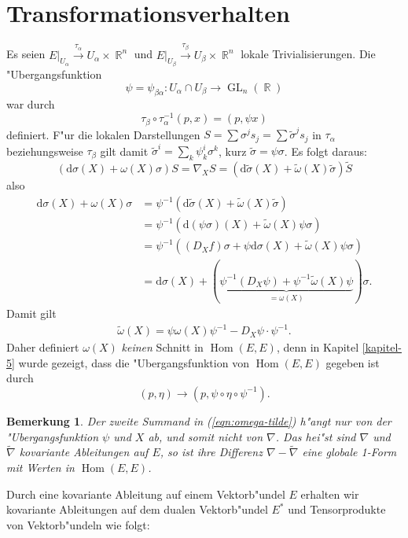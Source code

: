 \documentclass[paper=A4, twoside, chapterprefix=true, bibliography=totoc, headsepline]{scrbook}
\DeclareMathOperator{\R}{\mathbb{R}}
\DeclareMathOperator{\GL}{GL} %
\DeclareMathOperator{\Hom}{Hom} %
\newcommand{\dop}{\mathrm{d}}
\newcommand{\X}{\times}
\theoremstyle{plain}
\theoremstyle{nonumberplain}
\newtheorem{bem}{Bemerkung}
\theoremstyle{empty}
\theoremstyle{break}
\begin{document}
\section{Transformationsverhalten}

Es seien $E|_{U_\alpha} \overset{\tau_\alpha}{\to} U_\alpha \X \R^n$ und $E|_{U_\beta} \overset{\tau_\beta}{\to} U_{\beta} \X \R^n$ lokale Trivialisierungen. Die "Ubergangsfunktion
\[ \psi = \psi_{\beta\alpha}: U_\alpha \cap U_\beta \to \GL_n(\R) \]
war durch
\[ \tau_\beta \circ \tau_\alpha^{-1} (p,x) = (p, \psi x) \]
definiert.
F"ur die lokalen Darstellungen $S = \sum \sigma^j s_j = \sum \tilde\sigma^j s_j$ in $\tau_\alpha$ beziehungsweise $\tau_\beta$ gilt damit $\tilde\sigma^{i} = \sum_k \psi_k^{i} \sigma^k$, kurz $\tilde\sigma = \psi \sigma$.
Es folgt daraus:
\[ (\dop \sigma(X) + \omega(X) \sigma) S = \nabla_X S = (\dop \tilde\sigma(X) + \tilde\omega(X)\tilde\sigma) \tilde S \]
also
\begin{align*}
  \dop \sigma(X) + \omega(X) \sigma &= \psi^{-1}(\dop \tilde\sigma(X) + \tilde\omega(X) \tilde\sigma)\\
  &= \psi^{-1} (\dop(\psi\sigma)(X) + \tilde\omega(X) \psi \sigma)\\
  &= \psi^{-1} ((D_X f) \sigma + \psi \dop \sigma(X) + \tilde\omega(X) \psi \sigma)\\
  &= \dop \sigma(X) + (\underbrace{\psi^{-1}(D_X \psi) + \psi^{-1} \tilde\omega(X) \psi}_{=\omega(X)}) \sigma.
\end{align*}
Damit gilt
\begin{align}
  \tilde\omega(X) = \psi \omega(X) \psi^{-1} - D_X \psi \cdot \psi^{-1}.\label{eqn:omega-tilde}
\end{align}
Daher definiert $\omega(X)$ \emph{keinen} Schnitt in $\Hom(E, E)$, denn in Kapitel \ref{kapitel-5} wurde gezeigt, dass die "Ubergangsfunktion von $\Hom(E, E)$ gegeben ist durch
\[ (p, \eta) \to (p, \psi \circ \eta \circ \psi^{-1}). \]

\begin{bem}
  Der zweite Summand in (\ref{eqn:omega-tilde}) h"angt \emph{nur} von der "Ubergangsfunktion $\psi$ und $X$ ab, und somit \emph{nicht} von $\nabla$.
  Das hei"st sind $\nabla$ und $\tilde\nabla$ kovariante Ableitungen auf $E$, so ist ihre Differenz $\nabla - \tilde\nabla$ eine globale 1-Form mit Werten in $\Hom(E,E)$.
\end{bem}

Durch eine kovariante Ableitung auf einem Vektorb"undel $E$ erhalten wir kovariante Ableitungen auf dem dualen Vektorb"undel $E^*$ und Tensorprodukte von Vektorb"undeln wie folgt:
\end{document}
